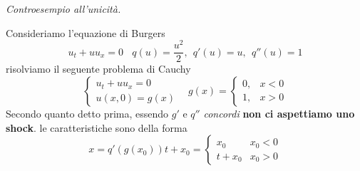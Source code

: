 \documentclass[10pt,a4paper,twoside,openright]{book}
\begin{document}
\textit{Controesempio all'unicità.}

Consideriamo l'equazione di Burgers
\begin{equation}
	u_{t} +uu_{x} =0\ \ \ \ q(u) =\frac{u^{2}}{2} ,\ \ q'(u) =u,\ \ q''(u) =1
\end{equation}
risolviamo il seguente problema di Cauchy
\begin{equation*}
	\begin{cases}
		u_{t} +uu_{x} =0 \\
		u(x,0) =g(x)   
	\end{cases} \ \ \ \ g(x) =
	\begin{cases}
		0, & x< 0 \\
		1, & x >0 
	\end{cases}
\end{equation*}
Secondo quanto detto prima, essendo $g'$ e $q''$ \emph{concordi} \textbf{non ci aspettiamo uno shock}.
le caratteristiche sono della forma
\begin{equation*}
	x=q'(g(x_{0})) t+x_{0} =
	\begin{cases}
		x_{0}   & x_{0} < 0 \\
		t+x_{0} & x_{0}  >0 
	\end{cases}
\end{equation*}
\end{document}
